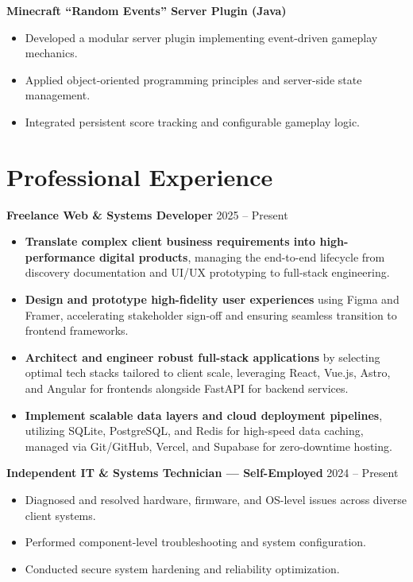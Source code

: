 \documentclass[10pt]{article}
\begin{document}
\textbf{Minecraft ``Random Events'' Server Plugin (Java)}
    \begin{itemize}
        \item Developed a modular server plugin implementing event-driven gameplay mechanics.
        \item Applied object-oriented programming principles and server-side state management.
        \item Integrated persistent score tracking and configurable gameplay logic.
    \end{itemize}

\section*{Professional Experience}

\textbf{Freelance Web \& Systems Developer} \hfill 2025 -- Present
\begin{itemize}
    \item \textbf{Translate complex client business requirements into high-performance digital products}, managing the end-to-end lifecycle from discovery documentation and UI/UX prototyping to full-stack engineering.
    \item \textbf{Design and prototype high-fidelity user experiences} using Figma and Framer, accelerating stakeholder sign-off and ensuring seamless transition to frontend frameworks.
    \item \textbf{Architect and engineer robust full-stack applications} by selecting optimal tech stacks tailored to client scale, leveraging React, Vue.js, Astro, and Angular for frontends alongside FastAPI for backend services.
    \item \textbf{Implement scalable data layers and cloud deployment pipelines}, utilizing SQLite, PostgreSQL, and Redis for high-speed data caching, managed via Git/GitHub, Vercel, and Supabase for zero-downtime hosting.
\end{itemize}

\textbf{Independent IT \& Systems Technician — Self-Employed} \hfill 2024 -- Present
\begin{itemize}
    \item Diagnosed and resolved hardware, firmware, and OS-level issues across diverse client systems.
    \item Performed component-level troubleshooting and system configuration.
    \item Conducted secure system hardening and reliability optimization.
\end{itemize}
\end{document}
